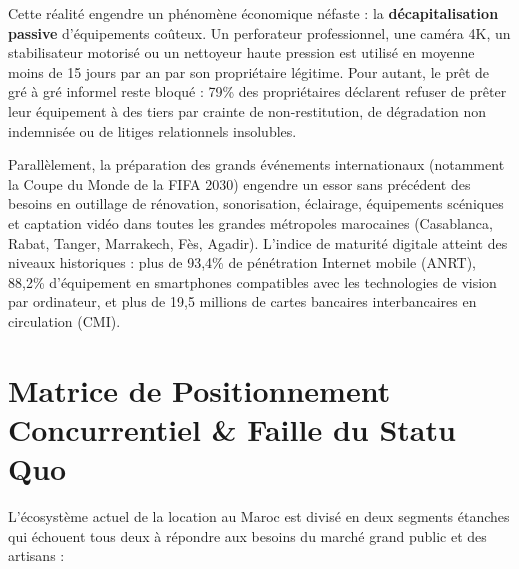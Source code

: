 \documentclass[11pt,a4paper]{report}
\begin{document}
Cette réalité engendre un phénomène économique néfaste : la \textbf{décapitalisation passive} d'équipements coûteux. Un perforateur professionnel, une caméra 4K, un stabilisateur motorisé ou un nettoyeur haute pression est utilisé en moyenne moins de 15 jours par an par son propriétaire légitime. Pour autant, le prêt de gré à gré informel reste bloqué : 79\% des propriétaires déclarent refuser de prêter leur équipement à des tiers par crainte de non-restitution, de dégradation non indemnisée ou de litiges relationnels insolubles.

Parallèlement, la préparation des grands événements internationaux (notamment la Coupe du Monde de la FIFA 2030) engendre un essor sans précédent des besoins en outillage de rénovation, sonorisation, éclairage, équipements scéniques et captation vidéo dans toutes les grandes métropoles marocaines (Casablanca, Rabat, Tanger, Marrakech, Fès, Agadir). L'indice de maturité digitale atteint des niveaux historiques : plus de 93,4\% de pénétration Internet mobile (ANRT), 88,2\% d'équipement en smartphones compatibles avec les technologies de vision par ordinateur, et plus de 19,5 millions de cartes bancaires interbancaires en circulation (CMI).

\section{Matrice de Positionnement Concurrentiel \& Faille du Statu Quo}
L'écosystème actuel de la location au Maroc est divisé en deux segments étanches qui échouent tous deux à répondre aux besoins du marché grand public et des artisans :
\end{document}
